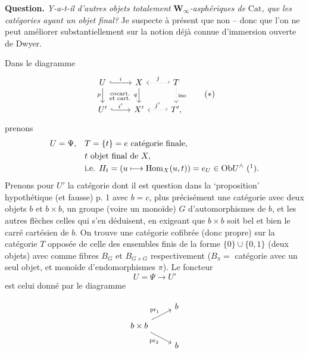 \documentclass[11pt]{article}
\newcommand{\printedpage}[1]{\marginpar{\footnotesize p.~#1}}
\newcommand{\msp}[1]{\marginpar{\footnotesize [#1]}}
\newcommand{\Hom}{\mathrm{Hom}}
\newcommand{\Ob}{\mathrm{Ob}}
\newcommand{\Cat}{\mathrm{Cat}}
\newcommand{\pr}{\mathrm{pr}}
\begin{document}
\printedpage{4}

\msp{page 5}
\textbf{Question.} \textit{Y-a-t-il d'autres objets totalement} $\mathbf{W}_\infty$\textit{-asphériques de} $\Cat$\textit{, que les catégories ayant un objet final?} Je suspecte à présent que non -- donc que l'on ne peut améliorer substantiellement sur la notion déjà connue d'immersion ouverte de Dwyer.

Dans le diagramme
\[
\begin{tikzcd}
U \arrow[r, hook, "i"] \arrow[d, "p"'] \arrow[dr, phantom, "\substack{\text{cocart.}\\ \text{et cart.}}"] & X \arrow[d, "q"'] & T \arrow[l, hook', dotted, "j"'] \arrow[d, dotted, "\text{iso}"] \\
U' \arrow[r, hook, "i'"] & X' & T', \arrow[l, hook', dotted, "j'"']
\end{tikzcd}
\tag*{$(*)$}
\]
prenons
\[
\begin{aligned}
U = \Psi, \quad & T = \{t\} = e \text{ catégorie finale,}\\
& t \text{ objet final de } X,\\
& \text{i.e. } H_t = (u\longmapsto \Hom_X(u,t)) = e_U \in \Ob U^\wedge \ \mbox{(\footnotemark)}.
\end{aligned}
\]
Prenons pour $U'$ la catégorie dont il est question dans la `proposition' hypothétique (et fausse) p. 1 avec $b = c$, plus précisément une catégorie avec deux objets $b$ et $b\times b$, un groupe (voire un monoïde) $G$ d'automorphismes de $b$, et les autres flèches celles qui s'en déduisent, en exigeant que $b\times b$ soit bel et bien le carré cartésien de $b$. On trouve une catégorie cofibrée (donc propre) sur la catégorie $T$ opposée de celle des ensembles finis de la forme $\{0\}\cup\{0,1\}$ (deux objets) avec comme fibres $B_G$ et $B_{G\times G}$ respectivement ($B_\pi =$ catégorie avec un seul objet, et monoïde d'endomorphismes $\pi$). Le foncteur
\[
U = \Psi \longrightarrow U'
\]
est celui donné par le diagramme

\msp{page 6}
\[
\begin{tikzcd}[row sep=small]
& b \\
b\times b \arrow[ur, "\pr_1"] \arrow[dr, "\pr_2"'] & \\
& b
\end{tikzcd}
\]
\end{document}
